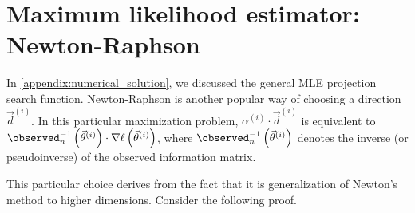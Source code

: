 \chapter{Maximum likelihood estimator: Newton-Raphson}
In \cref{appendix:numerical_solution}, we discussed the general MLE projection search function. Newton-Raphson is another popular way of choosing a direction $\vec{d}^{(i)}$. In this particular maximization problem, $\alpha^{(i)} \cdot \vec{d}^{(i)}$ is equivalent to $\observed^{-1}_{n}\left(\vec\theta^{(i)}\right) \cdot \nabla \ell \left(\vec\theta^{(i)}\right)$, where $\observed^{-1}_{n}\left(\vec\theta^{(i)}\right)$ denotes the inverse (or pseudoinverse) of the observed information matrix.

This particular choice derives from the fact that it is generalization of Newton's method to higher dimensions. Consider the following proof.
